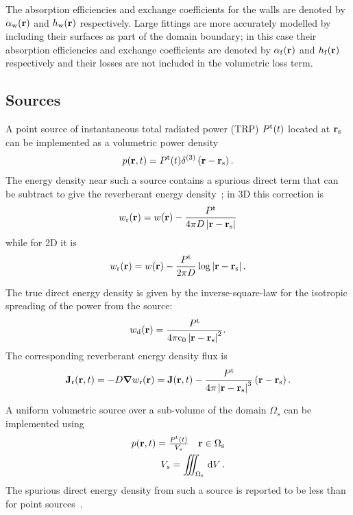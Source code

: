 \documentclass[a4paper]{article}
\numberwithin{equation}{section}
\begin{document}
The absorption efficiencies and exchange coefficients for the walls are denoted 
by $\alpha_{\mathrm{w}}(\boldsymbol{\mathrm{r}})$ and $h_{\mathrm{w}}(\boldsymbol{\mathrm{r}})$ respectively. Large fittings are more
accurately modelled by including their surfaces as part of the domain boundary; in 
this case their absorption efficiencies and exchange coefficients are denoted by
$\alpha_{\mathrm{f}}(\boldsymbol{\mathrm{r}})$ and $h_{\mathrm{f}}(\boldsymbol{\mathrm{r}})$ respectively and their losses are not included in the
volumetric loss term.

\subsection[Sources]{Sources}
\label{sc:sum:src}

A point source of instantaneous total radiated power (TRP) $P^{\mathrm{t}}(t)$
located at $\boldsymbol{\mathrm{r}}_{\mathrm{s}}$ can be implemented as a volumetric power density
\begin{align}
p(\boldsymbol{\mathrm{r}},t) = P^{\mathrm{t}}(t) \delta^{(3)}\left(\boldsymbol{\mathrm{r}}-\boldsymbol{\mathrm{r}}_{\mathrm{s}}\right).
\end{align}
The energy density near such a source contains a spurious direct term that can
be subtract to give the reverberant energy density~\citep{Visentin2012}; in 3D this correction is
\begin{align}
w_{\mathrm{r}}(\boldsymbol{\mathrm{r}}) = w(\boldsymbol{\mathrm{r}}) - \frac{P^{\mathrm{t}}}{4\pi D\left|\boldsymbol{\mathrm{r}}-\boldsymbol{\mathrm{r}}_{\mathrm{s}}\right|}
\end{align}
while for 2D it is
\begin{align}
w_{\mathrm{r}}(\boldsymbol{\mathrm{r}}) = w(\boldsymbol{\mathrm{r}}) - \frac{P^{\mathrm{t}}}{2\pi D} \log \left|\boldsymbol{\mathrm{r}}-\boldsymbol{\mathrm{r}}_{\mathrm{s}}\right|.
\end{align}

The true direct energy density is given by the inverse-square-law for the
isotropic spreading of the power from the source:
\begin{align}
w_{\mathrm{d}}(\boldsymbol{\mathrm{r}}) = \frac{P^{\mathrm{t}}}{4\pi\mathrm{c}_0\left|\boldsymbol{\mathrm{r}}-\boldsymbol{\mathrm{r}}_{\mathrm{s}}\right|^2}.
\end{align}
The corresponding reverberant energy density flux is
\begin{align}
\boldsymbol{\mathrm{J}}_{\mathrm{r}}(\boldsymbol{\mathrm{r}},t) = -D\boldsymbol{\mathrm{\nabla}} w_{\mathrm{r}}(\boldsymbol{\mathrm{r}}) = \boldsymbol{\mathrm{J}}(\boldsymbol{\mathrm{r}},t) - \frac{P^{\mathrm{t}}}{4\pi\left|\boldsymbol{\mathrm{r}}-\boldsymbol{\mathrm{r}}_{\mathrm{s}}\right|^3}\left(\boldsymbol{\mathrm{r}}-\boldsymbol{\mathrm{r}}_{\mathrm{s}}\right).
\end{align}

A uniform volumetric source over a sub-volume of the domain $\Omega_s$ can be implemented
using
\begin{align}
\begin{matrix} 
p(\boldsymbol{\mathrm{r}},t) = \frac{P^{\mathrm{t}}(t)}{V_s} &\boldsymbol{\mathrm{r}}\in\Omega_{\mathrm{s}} 
\end{matrix} \\
V_s = \iiint_{\Omega_{\mathrm{s}}}\,\mathrm{d}{V}\,.
\end{align}
The spurious direct energy density from such a source is reported to be less than for point
sources~\citep{Visentin2012}.
\end{document}
